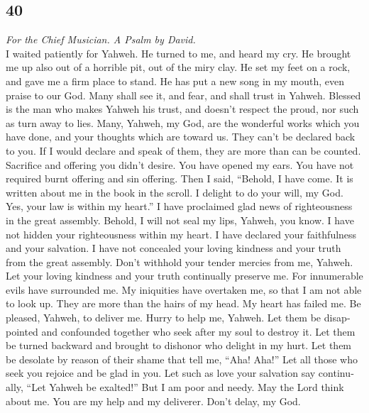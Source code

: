 \begin{paracol}{2}
\switchcolumn
\begin{otherlanguage}{english}

\hypertarget{section-79}{%
\section{40}\label{section-79}}

\emph{For the Chief Musician. A Psalm by David.}\\
 I waited patiently for Yahweh. He turned to me, and heard
my cry.  He brought me up also out of a horrible pit, out
of the miry clay. He set my feet on a rock, and gave me a firm place to
stand.  He has put a new song in my mouth, even praise to
our God. Many shall see it, and fear, and shall trust in Yahweh.
 Blessed is the man who makes Yahweh his trust, and
doesn't respect the proud, nor such as turn away to lies. 
Many, Yahweh, my God, are the wonderful works which you have done, and
your thoughts which are toward us. They can't be declared back to you.
If I would declare and speak of them, they are more than can be counted.
 Sacrifice and offering you didn't desire. You have opened
my ears. You have not required burnt offering and sin offering.
 Then I said, ``Behold, I have come. It is written about
me in the book in the scroll.  I delight to do your will,
my God. Yes, your law is within my heart.''  I have
proclaimed glad news of righteousness in the great assembly. Behold, I
will not seal my lips, Yahweh, you know.  I have not
hidden your righteousness within my heart. I have declared your
faithfulness and your salvation. I have not concealed your loving
kindness and your truth from the great assembly.  Don't
withhold your tender mercies from me, Yahweh. Let your loving kindness
and your truth continually preserve me.  For innumerable
evils have surrounded me. My iniquities have overtaken me, so that I am
not able to look up. They are more than the hairs of my head. My heart
has failed me.  Be pleased, Yahweh, to deliver me. Hurry
to help me, Yahweh.  Let them be disappointed and
confounded together who seek after my soul to destroy it. Let them be
turned backward and brought to dishonor who delight in my hurt.
 Let them be desolate by reason of their shame that tell
me, ``Aha! Aha!''  Let all those who seek you rejoice and
be glad in you. Let such as love your salvation say continually, ``Let
Yahweh be exalted!''  But I am poor and needy. May the
Lord think about me. You are my help and my deliverer. Don't delay, my
God.


\end{otherlanguage}
\end{paracol}
